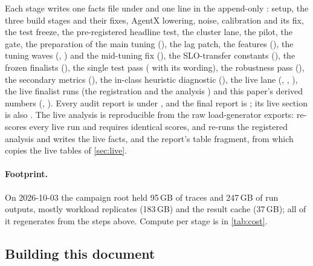 Each stage writes one facts file under  and one line in the append-only
: setup, the three build stages and their fixes, AgentX lowering, noise,
calibration and its fix, the test freeze, the pre-registered headline test, the cluster lane, the
pilot, the gate, the preparation of the main tuning (), the lag
patch, the \ais{} features (), the tuning waves
(, ) and the mid-tuning fix
(), the
SLO-transfer constants (), the frozen finalists
(), the single test pass ( with its
 wording), the robustness pass (), the
secondary metrics (), the in-class heuristic diagnostic
(), the live lane (,
, ), the live finalist runs
(the registration  and the analysis ) and
this paper's derived numbers (, ). Every
audit report is under , and the final report is ; its live
section is also . The live analysis is reproducible from the raw load-generator
exports:   re-scores every live run
and requires identical scores, and  re-runs the registered analysis and writes the live
facts,  and the report's table fragment, from which  copies the
live tables of \cref{sec:live}.

\paragraph{Footprint.}
On 2026-10-03 the campaign root held 95\,GB of traces and 247\,GB of run outputs, mostly workload
replicates (183\,GB) and the result cache (37\,GB); all of it regenerates from the steps above.
Compute per stage is in \cref{tab:cost}.

\subsection{Building this document}

